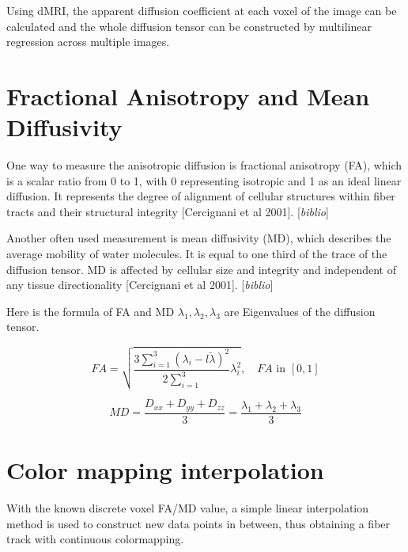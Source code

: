\documentclass[a4paper, 12pt]{report}
\newcommand{\comment}[1]{{\color{red}[\textit{#1}]}}
\begin{document}
Using dMRI, the apparent diffusion coefficient at each voxel of the image can be calculated and the whole diffusion tensor can be constructed by multilinear regression across multiple images.

\section{Fractional Anisotropy and Mean Diffusivity }
One way to measure the anisotropic diffusion is fractional anisotropy (FA), which is a scalar ratio from 0 to 1, with 0 representing isotropic and 1 as an ideal linear diffusion. It represents the degree of alignment of cellular structures within fiber tracts and their structural integrity [Cercignani et al 2001]. \comment{biblio}

Another often used measurement is mean diffusivity (MD), which describes the average mobility of water molecules. It is equal to one third of the trace of the diffusion tensor. MD is affected by cellular size and integrity and independent of any tissue directionality [Cercignani et al 2001]. \comment{biblio}

Here is the formula of FA and MD $\lambda_1, \lambda_2, \lambda_3$  are Eigenvalues of the diffusion tensor.

\begin{equation*}
	FA=\sqrt{\frac{3 \sum_{i=1}^{3}(\lambda_i-\bar{l\lambda})^2}{2\sum_{i=1}^3}\lambda_i^2}, \quad FA\text{ in } [0,1]
\end{equation*}

\begin{equation*}
	MD=\frac{D_{xx}+D_{yy}+D_{zz}}{3}= \frac{\lambda_1+\lambda_2+\lambda_3}{3}
\end{equation*}

\section{ Color mapping interpolation }
With the known discrete voxel FA/MD value, a simple linear interpolation method is used to construct new data points in between, thus obtaining a fiber track with continuous colormapping.
\end{document}
